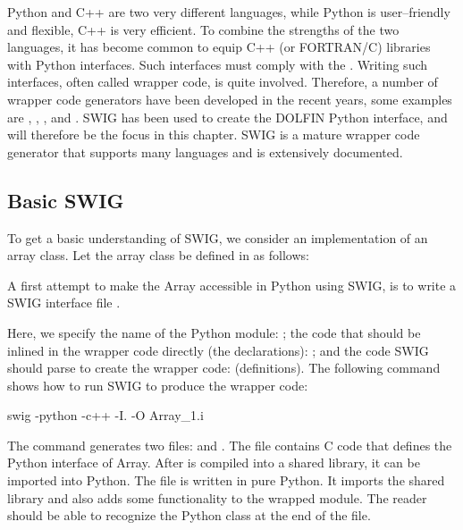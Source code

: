 Python and C++ are two very different languages, while Python is
user--friendly and flexible, C++ is very efficient.  To combine the
strengths of the two languages, it has become common to equip C++ (or
FORTRAN/C) libraries with Python interfaces.  Such interfaces must comply
with the \citet{www:python-capi}.  Writing such interfaces, often called
wrapper code, is quite involved.  Therefore, a number of wrapper code
generators have been developed in the recent years, some examples are
\citet{Peterson}, \citet{SIP}, \citet{Siloon}, and \citet{www:swig}.
SWIG has been used to create the DOLFIN Python interface, and will
therefore be the focus in this chapter. SWIG is a mature wrapper code
generator that supports many languages and is extensively documented.

\pagebreak%

\subsection{Basic SWIG}

To get a basic understanding of SWIG, we consider an implementation of an
array class.  Let the array class be defined in  as follows:\vspace*{3pt}


\vspace*{5pt}

\noindent A first attempt to make the
Array accessible in Python using SWIG, is to write a SWIG interface
file .\vspace*{3pt}



\vspace*{5pt}

\noindent Here, we specify the name of the Python module: ; the code
that should be inlined in the wrapper code directly (the declarations):
; and the code SWIG should parse to create the
wrapper code:  (definitions). The following
command shows how to run SWIG to produce the wrapper code:\vspace*{3pt}
\begin{bash}
swig -python -c++ -I. -O Array_1.i
\end{bash}

\vspace*{5pt}

\noindent The command generates two files:  and
. The file 
contains C code that defines the Python interface of Array.  After
 is compiled into a shared library, it can be
imported into Python.  The file  is written in pure
Python. It imports the shared library and also adds some functionality
to the wrapped module.  The reader should be able to recognize the Python
class  at the end of the  file.


